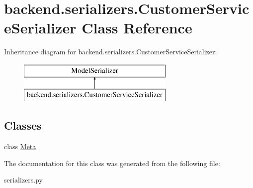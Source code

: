 \hypertarget{classbackend_1_1serializers_1_1_customer_service_serializer}{}\section{backend.\+serializers.\+Customer\+Service\+Serializer Class Reference}
\label{classbackend_1_1serializers_1_1_customer_service_serializer}
Inheritance diagram for backend.\+serializers.\+Customer\+Service\+Serializer\+:\begin{figure}[H]
\begin{center}
\leavevmode
\includegraphics[height=2.000000cm]{classbackend_1_1serializers_1_1_customer_service_serializer}
\end{center}
\end{figure}
\subsection*{Classes}
\begin{DoxyCompactItemize}
\item 
class \hyperlink{classbackend_1_1serializers_1_1_customer_service_serializer_1_1_meta}{Meta}
\end{DoxyCompactItemize}


The documentation for this class was generated from the following file\+:\begin{DoxyCompactItemize}
\item 
serializers.\+py\end{DoxyCompactItemize}
